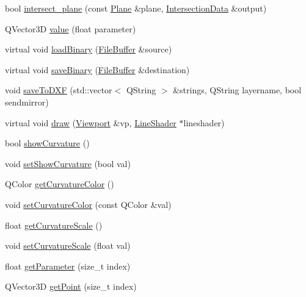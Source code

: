 \begin{DoxyCompactItemize}
\item 
bool \hyperlink{classShipCAD_1_1Spline_afd932e0c63a3b03200ecdc7c656be8e4}{intersect\-\_\-plane} (const \hyperlink{classShipCAD_1_1Plane}{Plane} \&plane, \hyperlink{classShipCAD_1_1IntersectionData}{Intersection\-Data} \&output)
\item 
Q\-Vector3\-D \hyperlink{classShipCAD_1_1Spline_a589d6d945e0fbb905ea94907cd216165}{value} (float parameter)
\item 
virtual void \hyperlink{classShipCAD_1_1Spline_ae90c8807fb8058d6309f47db64e2d40e}{load\-Binary} (\hyperlink{classShipCAD_1_1FileBuffer}{File\-Buffer} \&source)
\item 
virtual void \hyperlink{classShipCAD_1_1Spline_abaf1c6eebdfe8abd41287c1fcb38a808}{save\-Binary} (\hyperlink{classShipCAD_1_1FileBuffer}{File\-Buffer} \&destination)
\item 
void \hyperlink{classShipCAD_1_1Spline_a347502f38c64a12fc19a95e19aad5d7d}{save\-To\-D\-X\-F} (std\-::vector$<$ Q\-String $>$ \&strings, Q\-String layername, bool sendmirror)
\item 
virtual void \hyperlink{classShipCAD_1_1Spline_a6424ed433d241f566c15891cc25a74dd}{draw} (\hyperlink{classShipCAD_1_1Viewport}{Viewport} \&vp, \hyperlink{classShipCAD_1_1LineShader}{Line\-Shader} $\ast$lineshader)
\item 
bool \hyperlink{classShipCAD_1_1Spline_a2c232b5ca5da62ba07ec9aa8ede3fd17}{show\-Curvature} ()
\item 
void \hyperlink{classShipCAD_1_1Spline_aae0f5ce3bc2aa58759abd32f3462bf16}{set\-Show\-Curvature} (bool val)
\item 
Q\-Color \hyperlink{classShipCAD_1_1Spline_ae2e47ccb73a45e0f0d2df2484ba509ae}{get\-Curvature\-Color} ()
\item 
void \hyperlink{classShipCAD_1_1Spline_ac40c22712433f98d657ecaed459d03a0}{set\-Curvature\-Color} (const Q\-Color \&val)
\item 
float \hyperlink{classShipCAD_1_1Spline_ade326d9cd43b6523516b1113b0bddd1b}{get\-Curvature\-Scale} ()
\item 
void \hyperlink{classShipCAD_1_1Spline_a17ba0378bfd4a39b4d96d914332c26e4}{set\-Curvature\-Scale} (float val)
\item 
float \hyperlink{classShipCAD_1_1Spline_ac617856776bb267bdab050b56de4ec74}{get\-Parameter} (size\-\_\-t index)
\item 
Q\-Vector3\-D \hyperlink{classShipCAD_1_1Spline_ad316be28cfd23e518f9e761c46644440}{get\-Point} (size\-\_\-t index)
\item 

\end{DoxyCompactItemize}
